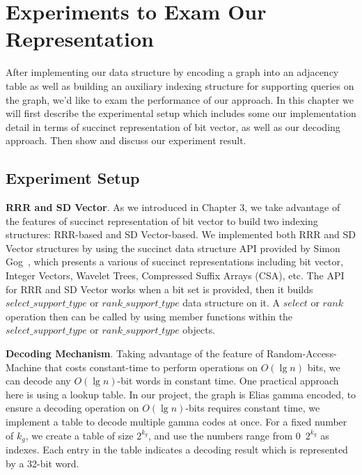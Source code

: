\documentclass[12pt,glossary]{dalthesis}
\begin{document}
\chapter{Experiments to Exam Our Representation}
After implementing our data structure by encoding a graph into an adjacency table as well as building an auxiliary indexing structure for supporting queries on the graph, we'd like to exam the performance of our approach. In this chapter we will first describe the experimental setup which includes some our implementation detail in terms of succinct representation of bit vector, as well as our decoding approach. Then show and discuss our experiment result.

\bigskip
 
\section{Experiment Setup}

\bigskip
\textbf{RRR and SD Vector}. As we introduced in Chapter 3, we take advantage of the features of succinct representation of bit vector to build two indexing structures: RRR-based and SD Vector-based. We implemented both RRR and SD Vector structures by using the succinct data structure API provided by Simon Gog~\cite{sdsl}, which presents a various of succinct representations including bit vector, Integer Vectors, Wavelet Trees, Compressed Suffix Arrays (CSA), etc. The API for RRR and SD Vector works when a bit set is provided, then it builds $select\_support\_type$ or $rank\_support\_type$ data structure on it. A $select$ or $rank$ operation then can be called by using member functions within the $select\_support\_type$ or $rank\_support\_type$ objects.  

\bigskip
\bigskip

\textbf{Decoding Mechanism}. Taking advantage of the feature of Random-Access-Machine that costs constant-time to perform operations on $O(\lg n)$ bits, we can decode any $O(\lg n)$-bit words in constant time. One practical approach here is using a lookup table. In our project, the graph is Elias gamma encoded, to ensure a decoding operation on $O(\lg n)$-bits requires constant time, we implement a table to decode multiple gamma codes at once. For a fixed number of $k_{g}$, we create a table of size $2^{k_{g}}$, and use the numbers range from 0~$2^{k_{g}}$ as indexes. Each entry in the table indicates a decoding result which is represented by a 32-bit word.  

\bigskip
\end{document}
